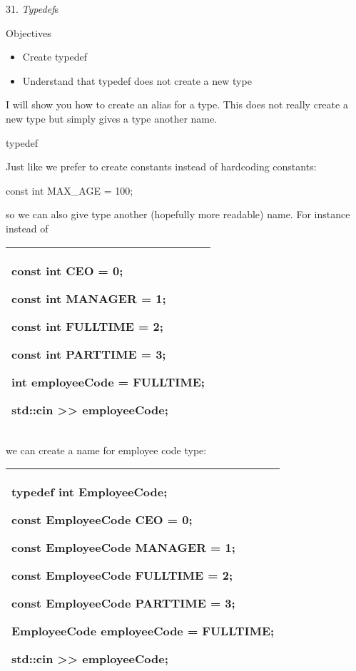 \documentclass[
]{article}
\author{}
\date{}
\providecommand{\tightlist}{%
  \setlength{\itemsep}{0pt}\setlength{\parskip}{0pt}}
\begin{document}
31. \emph{Typedef}s

Objectives

\begin{itemize}
\tightlist
\item
  Create typedef
\item
  Understand that typedef does not create a new type
\end{itemize}

I will show you how to create an alias for a type. This does not really
create a new type but simply gives a type another name.

typedef

Just like we prefer to create constants instead of hardcoding constants:

const int MAX\_AGE = 100;

so we can also give type another (hopefully more readable) name. For
instance instead of

\begin{longtable}[]{@{}l@{}}
\toprule
\endhead
\begin{minipage}[t]{0.97\columnwidth}\raggedright
const int CEO = 0;

const int MANAGER = 1;

const int FULLTIME = 2;

const int PARTTIME = 3;

int employeeCode = FULLTIME;

std::cin \textgreater\textgreater{} employeeCode;\strut
\end{minipage}\tabularnewline
\bottomrule
\end{longtable}

we can create a name for employee code type:

\begin{longtable}[]{@{}l@{}}
\toprule
\endhead
\begin{minipage}[t]{0.97\columnwidth}\raggedright
typedef int EmployeeCode;

const EmployeeCode CEO = 0;

const EmployeeCode MANAGER = 1;

const EmployeeCode FULLTIME = 2;

const EmployeeCode PARTTIME = 3;

EmployeeCode employeeCode = FULLTIME;

std::cin \textgreater\textgreater{} employeeCode;\strut
\end{minipage}\tabularnewline
\bottomrule
\end{longtable}
\end{document}
